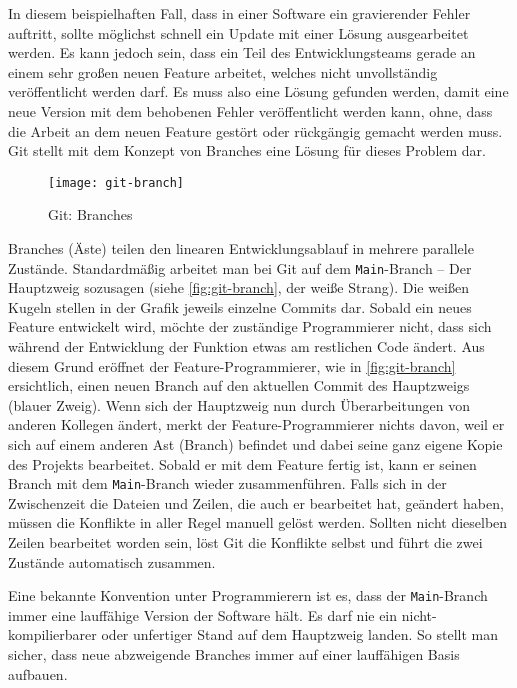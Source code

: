 In diesem beispielhaften Fall, dass in einer Software ein gravierender Fehler
auftritt, sollte möglichst schnell ein Update mit einer Lösung ausgearbeitet
werden. Es kann jedoch sein, dass ein Teil des Entwicklungsteams gerade an einem
sehr großen neuen Feature arbeitet, welches nicht unvollständig veröffentlicht
werden darf. Es muss also eine Lösung gefunden werden, damit eine neue Version
mit dem behobenen Fehler veröffentlicht werden kann, ohne, dass die Arbeit an
dem neuen Feature gestört oder rückgängig gemacht werden muss. Git stellt mit
dem Konzept von Branches eine Lösung für dieses Problem dar.

\begin{figure}[h]
    \centering
    \texttt{[image: git-branch]}
    \caption{Git: Branches}
    \label{fig:git-branch}
\end{figure}

Branches (Äste) teilen den linearen Entwicklungsablauf in mehrere parallele
Zustände. Standardmäßig arbeitet man bei Git auf dem \texttt{Main}-Branch -- Der
Hauptzweig sozusagen (siehe \autoref{fig:git-branch}, der weiße Strang).
Die weißen Kugeln stellen in der Grafik jeweils einzelne Commits dar. Sobald ein
neues Feature entwickelt wird, möchte der zuständige Programmierer nicht, dass
sich während der Entwicklung der Funktion etwas am restlichen Code ändert. Aus
diesem Grund eröffnet der Feature-Programmierer, wie in \autoref{fig:git-branch}
ersichtlich, einen neuen Branch auf den aktuellen Commit des Hauptzweigs (blauer
Zweig). Wenn sich der Hauptzweig nun durch Überarbeitungen von anderen Kollegen
ändert, merkt der Feature-Programmierer nichts davon, weil er sich auf einem
anderen Ast (Branch) befindet und dabei seine ganz eigene Kopie des Projekts
bearbeitet. Sobald er mit dem Feature fertig ist, kann er seinen Branch mit dem
\texttt{Main}-Branch wieder zusammenführen. Falls sich in der Zwischenzeit die
Dateien und Zeilen, die auch er bearbeitet hat, geändert haben, müssen die
Konflikte in aller Regel manuell gelöst werden. Sollten nicht dieselben Zeilen
bearbeitet worden sein, löst Git die Konflikte selbst und führt die zwei
Zustände automatisch zusammen.

Eine bekannte Konvention unter Programmierern ist es, dass der
\texttt{Main}-Branch immer eine lauffähige Version der Software hält. Es darf
nie ein nicht-kompilierbarer oder unfertiger Stand auf dem Hauptzweig landen.
So stellt man sicher, dass neue abzweigende Branches immer auf einer
lauffähigen Basis aufbauen. \parencite{git-branches}

